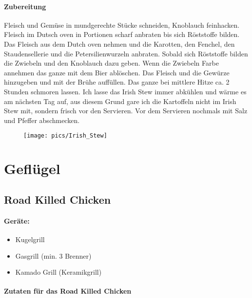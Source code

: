\paragraph{Zubereitung}

Fleisch und Gemüse in mundgerechte Stücke schneiden, Knoblauch feinhacken. 
Fleisch im Dutsch oven in Portionen scharf anbraten bis sich Röststoffe bilden. Das Fleisch 
aus dem Dutch oven nehmen und die Karotten, den Fenchel, den Staudensellerie und die 
Petersilienwurzeln anbraten. Sobald sich Röststoffe bilden die Zwiebeln und den Knoblauch 
dazu geben. Wenn die Zwiebeln Farbe annehmen das ganze mit dem Bier ablöschen. Das 
Fleisch und die Gewürze hinzugeben und mit der Brühe auffüllen. Das ganze bei mittlere Hitze ca. 2 Stunden
schmoren lassen. Ich lasse das Irish Stew immer abkühlen und wärme es am nächsten Tag auf,
aus diesem Grund gare ich die Kartoffeln nicht im Irish Stew mit, sondern frisch vor den Servieren. 
Vor dem Servieren nochmals mit Salz und Pfeffer abschmecken.

\begin{figure}[htbp]
	\centering
	\begin{minipage}{1\textwidth}
		\centering
		\texttt{[image: pics/Irish\_Stew]}
		\label{fig:Irish_Stew}
	\end{minipage}
\end{figure}
\newpage


\section{Geflügel}

\subsection{Road Killed Chicken}

\paragraph{Geräte:}

\begin{itemize}[noitemsep]
	\item Kugelgrill
 	\item Gasgrill (min. 3 Brenner)
	\item Kamado Grill (Keramikgrill)
\end{itemize}

\paragraph{Zutaten für das Road Killed Chicken}

